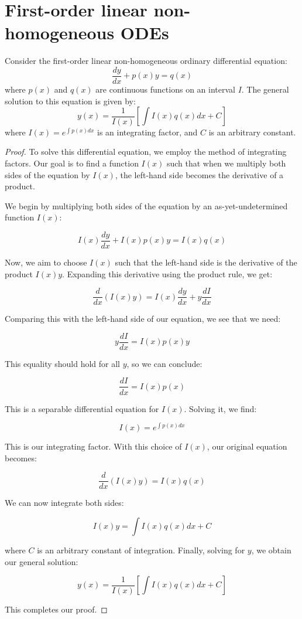 \section{First-order linear non-homogeneous ODEs}

\begin{theorem}
Consider the first-order linear non-homogeneous ordinary differential equation:
\[
\frac{dy}{dx} + p(x)y = q(x)
\]
where $p(x)$ and $q(x)$ are continuous functions on an interval $I$. The general solution to this equation is given by:
\[
y(x) = \frac{1}{I(x)}\left[\int I(x)q(x)dx + C\right]
\]
where $I(x) = e^{\int p(x)dx}$ is an integrating factor, and $C$ is an arbitrary constant.
\end{theorem}

\begin{proof}
To solve this differential equation, we employ the method of integrating factors. Our goal is to find a function $I(x)$ such that when we multiply both sides of the equation by $I(x)$, the left-hand side becomes the derivative of a product.

We begin by multiplying both sides of the equation by an as-yet-undetermined function $I(x)$:

\[
I(x)\frac{dy}{dx} + I(x)p(x)y = I(x)q(x)
\]

Now, we aim to choose $I(x)$ such that the left-hand side is the derivative of the product $I(x)y$. Expanding this derivative using the product rule, we get:

\[
\frac{d}{dx}(I(x)y) = I(x)\frac{dy}{dx} + y\frac{dI}{dx}
\]

Comparing this with the left-hand side of our equation, we see that we need:

\[
y\frac{dI}{dx} = I(x)p(x)y
\]

This equality should hold for all $y$, so we can conclude:

\[
\frac{dI}{dx} = I(x)p(x)
\]

This is a separable differential equation for $I(x)$. Solving it, we find:

\[
I(x) = e^{\int p(x)dx}
\]

This is our integrating factor. With this choice of $I(x)$, our original equation becomes:

\[
\frac{d}{dx}(I(x)y) = I(x)q(x)
\]

We can now integrate both sides:

\[
I(x)y = \int I(x)q(x)dx + C
\]

where $C$ is an arbitrary constant of integration. Finally, solving for $y$, we obtain our general solution:

\[
y(x) = \frac{1}{I(x)}\left[\int I(x)q(x)dx + C\right]
\]

This completes our proof.
\end{proof}

